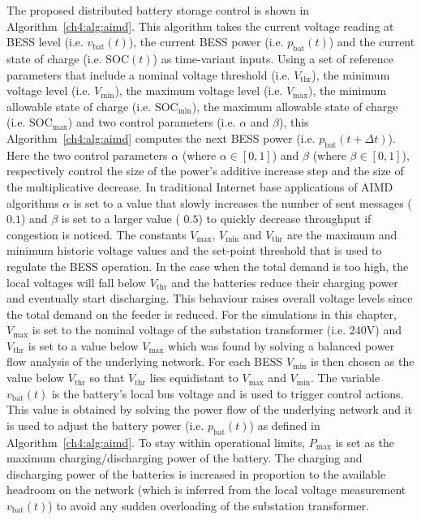 The proposed distributed battery storage control is shown in Algorithm~\ref{ch4:alg:aimd}.
This algorithm takes the current voltage reading at BESS level (i.e. $v_\text{bat}(t)$), the current BESS power (i.e. $p_\text{bat}(t)$) and the current state of charge (i.e. $\text{SOC}(t)$) as time-variant inputs.
Using a set of reference parameters that include a nominal voltage threshold (i.e. $V_\text{thr}$), the minimum voltage level (i.e. $V_\text{min}$), the maximum voltage level (i.e. $V_\text{max}$), the minimum allowable state of charge (i.e. $\text{SOC}_\text{min}$), the maximum allowable state of charge (i.e. $\text{SOC}_\text{max}$) and two control parameters (i.e. $\alpha$ and $\beta$), this Algorithm~\ref{ch4:alg:aimd} computes the next BESS power (i.e. $p_\text{bat}(t + \Delta t)$).
Here the two control parameters $\alpha$ (where $\alpha \in [0, 1]$) and $\beta$ (where $\beta \in [0, 1]$), respectively control the size of the power's additive increase step and the size of the multiplicative decrease.
In traditional Internet base applications of AIMD algorithms $\alpha$ is set to a value that slowly increases the number of sent messages ( $0.1$) and $\beta$ is set to a larger value ( $0.5$) to quickly decrease throughput if congestion is noticed.
The constants $V_\text{max}$, $V_\text{min}$ and $V_\text{thr}$ are the maximum and minimum historic voltage values and the set-point threshold that is used to regulate the BESS operation.
In the case when the total demand is too high, the local voltages will fall below $V_\text{thr}$ and the batteries reduce their charging power and eventually start discharging.
This behaviour raises overall voltage levels since the total demand on the feeder is reduced.
For the simulations in this chapter, $V_\text{max}$ is set to the nominal voltage of the substation transformer (i.e. 240V) and $V_\text{thr}$ is set to a value below $V_\text{max}$ which was found by solving a balanced power flow analysis of the underlying network.
For each BESS $V_\text{min}$ is then chosen as the value below $V_\text{thr}$ so that $V_\text{thr}$ lies equidistant to $V_\text{max}$ and $V_\text{min}$.
The variable $v_\text{bat}(t)$ is the battery's local bus voltage and is used to trigger control actions.
This value is obtained by solving the power flow of the underlying network and it is used to adjust the battery power (i.e. $p_\text{bat}(t)$) as defined in Algorithm~\ref{ch4:alg:aimd}.
To stay within operational limits, $P_\text{max}$ is set as the maximum charging/discharging power of the battery.
The charging and discharging power of the batteries is increased in proportion to the available headroom on the network (which is inferred from the local voltage measurement $v_\text{bat}(t)$) to avoid any sudden overloading of the substation transformer.

